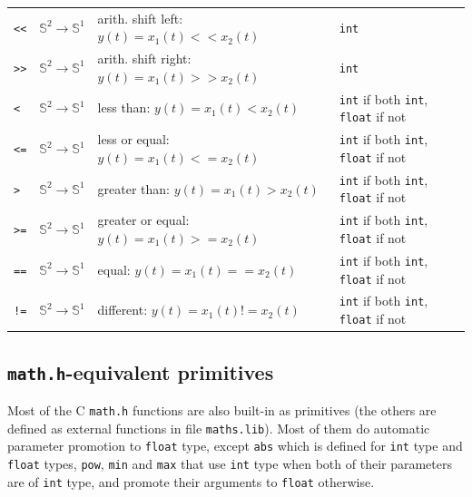 \begin{tabular}{|l|l|l|l|}
\texttt{<}\texttt{<} & $\mathbb{S}^{2}\rightarrow\mathbb{S}^{1}$ & arith. shift left: $y(t)=x_{1}(t) << x_{2}(t)$   	& \texttt{int} \\
\texttt{>}\texttt{>} & $\mathbb{S}^{2}\rightarrow\mathbb{S}^{1}$ & arith. shift right: $y(t)=x_{1}(t) >> x_{2}(t)$  	& \texttt{int}  \\


\texttt{<} & $\mathbb{S}^{2}\rightarrow\mathbb{S}^{1}$ & less than: $y(t)=x_{1}(t) < x_{2}(t)$  			& \texttt{int} if both \texttt{int}, \texttt{float} if not  \\
\texttt{<=} & $\mathbb{S}^{2}\rightarrow\mathbb{S}^{1}$ & less or equal: $y(t)=x_{1}(t) <= x_{2}(t)$  		& \texttt{int} if both \texttt{int}, \texttt{float} if not \\
\texttt{>} & $\mathbb{S}^{2}\rightarrow\mathbb{S}^{1}$ & greater than: $y(t)=x_{1}(t) > x_{2}(t)$   	   	& \texttt{int} if both \texttt{int}, \texttt{float} if not \\
\texttt{>=} & $\mathbb{S}^{2}\rightarrow\mathbb{S}^{1}$ & greater or equal: $y(t)=x_{1}(t) >= x_{2}(t)$   	& \texttt{int} if both \texttt{int}, \texttt{float} if not \\
\texttt{==} & $\mathbb{S}^{2}\rightarrow\mathbb{S}^{1}$ & equal: $y(t)=x_{1}(t) == x_{2}(t)$ 			& \texttt{int} if both \texttt{int}, \texttt{float} if not  \\
\texttt{!=} & $\mathbb{S}^{2}\rightarrow\mathbb{S}^{1}$ & different: $y(t)=x_{1}(t) != x_{2}(t)$  			& \texttt{int} if both \texttt{int}, \texttt{float} if not \\

\hline

\end{tabular}

\bigskip

\subsection{\texttt{math.h}-equivalent primitives}

Most of the C \texttt{math.h} functions are also built-in as primitives (the others are defined as external functions in file \texttt{maths.lib}). 
Most of them do automatic parameter promotion to \texttt{float} type, except \lstinline'abs' which is defined for \texttt{int} type and \texttt{float} types, \lstinline'pow', \lstinline'min' and \lstinline'max' that use \texttt{int} type when both of their parameters are of \texttt{int} type, and promote their arguments to \texttt{float} otherwise.

